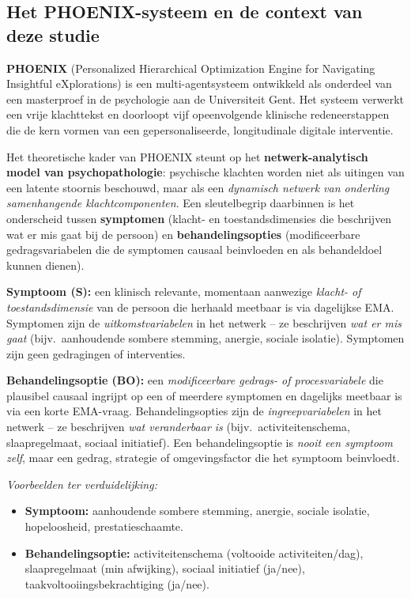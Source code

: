 \documentclass[11pt,a4paper]{article}
\begin{document}
\subsection*{Het PHOENIX-systeem en de context van deze studie}

\textbf{PHOENIX} (Personalized Hierarchical Optimization Engine for Navigating
Insightful eXplorations) is een multi-agentsysteem ontwikkeld als onderdeel van
een masterproef in de psychologie aan de Universiteit Gent. Het systeem verwerkt
een vrije klachttekst en doorloopt vijf opeenvolgende klinische redeneerstappen
die de kern vormen van een gepersonaliseerde, longitudinale digitale interventie.

Het theoretische kader van PHOENIX steunt op het \textbf{netwerk-analytisch model
van psychopathologie}: psychische klachten worden niet
als uitingen van een latente stoornis beschouwd, maar als een \emph{dynamisch
netwerk van onderling samenhangende klachtcomponenten}. Een sleutelbegrip daarbinnen
is het onderscheid tussen \textbf{symptomen} (klacht- en toestandsdimensies die
beschrijven wat er mis gaat bij de persoon) en \textbf{behandelingsopties}
(modificeerbare gedragsvariabelen die de symptomen causaal beinvloeden en als
behandeldoel kunnen dienen).

\vspace{0.4em}
\begin{instrbox}[title={Kerndefinities: symptoom versus behandelingsoptie}]
\small
\textbf{Symptoom (S):} een klinisch relevante, momentaan aanwezige
\emph{klacht- of toestandsdimensie} van de persoon die herhaald meetbaar is via
dagelijkse EMA. Symptomen zijn de \emph{uitkomstvariabelen} in het netwerk -- ze
beschrijven \emph{wat er mis gaat} (bijv.\ aanhoudende sombere stemming, anergie,
sociale isolatie). Symptomen zijn geen gedragingen of interventies.

\medskip
\textbf{Behandelingsoptie (BO):} een \emph{modificeerbare gedrags- of procesvariabele}
die plausibel causaal ingrijpt op een of meerdere symptomen en dagelijks meetbaar
is via een korte EMA-vraag. Behandelingsopties zijn de \emph{ingreepvariabelen} in het
netwerk -- ze beschrijven \emph{wat veranderbaar is} (bijv.\ activiteitenschema,
slaapregelmaat, sociaal initiatief). Een behandelingsoptie is \emph{nooit een symptoom zelf},
maar een gedrag, strategie of omgevingsfactor die het symptoom beinvloedt.

\medskip\small
\textit{Voorbeelden ter verduidelijking:}
\begin{itemize}[topsep=1pt,itemsep=0pt]
\item \textbf{Symptoom:} aanhoudende sombere stemming, anergie, sociale isolatie, hopeloosheid, prestatieschaamte.
\item \textbf{Behandelingsoptie:} activiteitenschema (voltooide activiteiten/dag), slaapregelmaat (min afwijking),
sociaal initiatief (ja/nee), taakvoltooiingsbekrachtiging (ja/nee).
\end{itemize}
\end{instrbox}
\end{document}
